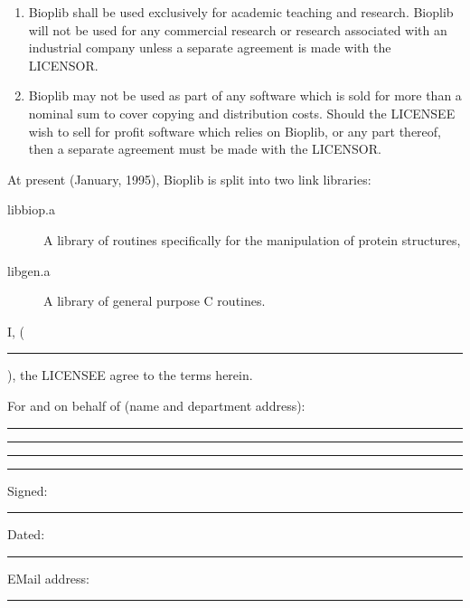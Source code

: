 \documentclass[12pt]{article}
\newcommand{\licensee}{\rule{5.3in}{0.5pt}\mbox{}}
\begin{document}
\begin{enumerate}
\item Bioplib shall be used exclusively for academic teaching and
research. Bioplib will not be used for any commercial research or
research associated with an industrial company unless a separate 
agreement is made with the LICENSOR.

\item Bioplib may not be used as part of any software which is sold
for more than a nominal sum to cover copying and distribution
costs. Should the LICENSEE wish to sell for profit software which
relies on Bioplib, or any part thereof, then a separate agreement must
be made with the LICENSOR.

\end{enumerate}
\newpage


\noindent At present (January, 1995), Bioplib is split into two link libraries:
\begin{description}
\item[libbiop.a] A library of routines specifically for the
manipulation of protein structures,
\item[libgen.a] A library of general purpose C routines.
\end{description}

\vspace{0.5in}


\noindent I, (\licensee), the LICENSEE agree to the terms herein.

\noindent For and on behalf of (name and department address):\\
\vskip 0.25in
\noindent\rule{5in}{0.5pt}
\vskip 0.25in
\noindent\rule{5in}{0.5pt}
\vskip 0.25in
\noindent\rule{5in}{0.5pt}
\vskip 0.25in
\noindent\rule{5in}{0.5pt}
\vskip 0.25in

\noindent Signed: \rule{3in}{0.5pt}
\vskip 0.25in

\noindent Dated: \rule{3in}{0.5pt}
\vskip 0.25in

\noindent EMail address: \rule{3in}{0.5pt}
\end{document}
